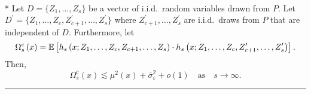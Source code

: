 \begin{lem}\label{lem:omega_sc}\mbox{}\\*
	Let $D = \{Z_1, \dotsc, Z_{s}\}$ be a vector of i.i.d.\ random variables drawn from $P$.
	Let $D^{\prime} = \{Z_1, \dotsc, Z_{c}, Z_{c+1}^{\prime}, \dotsc,  Z_{s}^{\prime}\}$ where $Z_{c+1}^{\prime}, \dotsc,  Z_{s}^{\prime}$ are i.i.d.\ draws from $P$ that are independent of $D$.
	Furthermore, let
	\begin{equation}
		\Omega_{s}^{c}\left(x\right)
		= \mathbb{E}\left[h_{s}\left(x; Z_1, \ldots, Z_{c}, Z_{c+1}, \ldots, Z_{s}\right) \cdot
			h_{s}\left(x; Z_1, \ldots,Z_{c}, Z_{c+1}^{\prime}, \ldots, Z_{s}^{\prime}\right)\right].
	\end{equation}
	Then,
	\begin{equation}
		\Omega_{s}^{c}\left(x\right)
		\lesssim \mu^2(x) + \overline{\sigma}_{\varepsilon}^2 + o(1)
		\quad \text{as} \quad s \rightarrow \infty.
	\end{equation}
\end{lem}

\hrule

